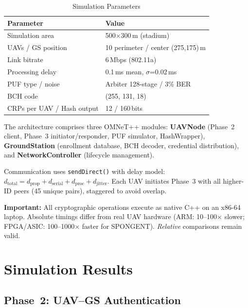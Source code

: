 \documentclass[conference]{IEEEtran}
\begin{document}
\begin{table}[H]
\centering
\caption{Simulation Parameters}
\label{tab:sim_params}
\footnotesize
\begin{tabular}{@{}ll@{}}
\toprule
\textbf{Parameter} & \textbf{Value} \\
\midrule
Simulation area & 500$\times$300\,m (stadium) \\
UAVs / GS position & 10 perimeter / center (275,175)\,m \\
Link bitrate & 6\,Mbps (802.11a) \\
Processing delay & 0.1\,ms mean, $\sigma$=0.02\,ms \\
PUF type / noise & Arbiter 128-stage / 3\% BER \\
BCH code & (255, 131, 18) \\
CRPs per UAV / Hash output & 12 / 160\,bits \\
\bottomrule
\end{tabular}
\end{table}

The architecture comprises three OMNeT++ modules: \textbf{UAVNode} (Phase~2 client, Phase~3 initiator/responder, PUF simulator, HashWrapper), \textbf{GroundStation} (enrollment database, BCH decoder, credential distribution), and \textbf{NetworkController} (lifecycle management).

Communication uses \texttt{sendDirect()} with delay model: $d_{\text{total}} = d_{\text{prop}} + d_{\text{serial}} + d_{\text{proc}} + d_{\text{jitter}}$. Each UAV initiates Phase~3 with all higher-ID peers (45 unique pairs), staggered to avoid overlap.

\textbf{Important:} All cryptographic operations execute as native C++ on an x86-64 laptop. Absolute timings differ from real UAV hardware (ARM: 10--100$\times$ slower; FPGA/ASIC: 100--1000$\times$ faster for SPONGENT). \emph{Relative} comparisons remain valid.

\section{Simulation Results}
\label{sec:results}

\subsection{Phase~2: UAV--GS Authentication}
\end{document}
